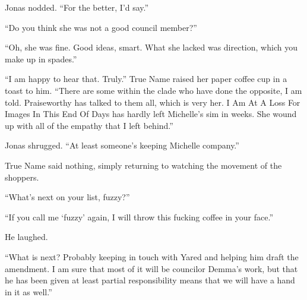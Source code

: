 Jonas nodded. ``For the better, I'd say.''

``Do you think she was not a good council member?''

``Oh, she was fine. Good ideas, smart. What she lacked was direction, which you make up in spades.''

``I am happy to hear that. Truly.'' True Name raised her paper coffee cup in a toast to him. ``There are some within the clade who have done the opposite, I am told. Praiseworthy has talked to them all, which is very her. I Am At A Loss For Images In This End Of Days has hardly left Michelle's sim in weeks. She wound up with all of the empathy that I left behind.''

Jonas shrugged. ``At least someone's keeping Michelle company.''

True Name said nothing, simply returning to watching the movement of the shoppers.

``What's next on your list, fuzzy?''

``If you call me `fuzzy' again, I will throw this fucking coffee in your face.''

He laughed.

``What is next? Probably keeping in touch with Yared and helping him draft the amendment. I am sure that most of it will be councilor Demma's work, but that he has been given at least partial responsibility means that we will have a hand in it as well.''
